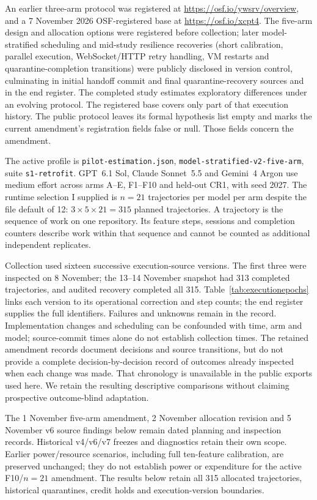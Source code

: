 An earlier three-arm protocol was registered at \url{https://osf.io/ywsrv/overview},
and a 7 November 2026 OSF-registered base at
\url{https://osf.io/xcpt4}. The five-arm design and allocation options were
registered before collection; later model-stratified scheduling and mid-study resilience
recoveries (short calibration, parallel execution, WebSocket/HTTP retry
handling, VM restarts and quarantine-completion transitions) were publicly
disclosed in version control, culminating in initial handoff commit
 and final quarantine-recovery sources
 and  in the end register.
The completed study estimates exploratory differences under an evolving
protocol. The registered base covers only part of that execution history.
The public protocol leaves its formal hypothesis list empty and marks the
current amendment's registration fields false or null. Those fields concern
the amendment.

The active profile is \nolinkurl{pilot-estimation.json},
\texttt{model-stratified-v2-five-arm}, suite \texttt{s1-retrofit}.
GPT~6.1 Sol, Claude Sonnet~5.5 and Gemini~4 Argon use medium effort across
arms A--E, F1--F10 and held-out CR1, with seed 2027. The runtime selection
I supplied is $n=21$ trajectories per model per arm despite the
file default of 12: $3\times5\times21=315$ planned trajectories.
A trajectory is the sequence of work on one repository. Its feature steps,
sessions and completion counters describe work within that sequence and
cannot be counted as additional independent replicates.

Collection used sixteen successive execution-source versions.
The first three were inspected on 8 November;
the 13--14 November snapshot had 313 completed trajectories, and audited
recovery completed all 315. Table~\ref{tab:executionepochs} links each version
to its operational correction and step counts; the end register supplies
the full identifiers. Failures and unknowns remain in the record.
Implementation changes and scheduling can be confounded with time, arm
and model; source-commit times alone do not establish collection times.
The retained amendment records document decisions and source transitions,
but do not provide a complete decision-by-decision record of outcomes
already inspected when each change was made. That chronology is unavailable
in the public exports used here. We retain the resulting descriptive
comparisons without claiming prospective outcome-blind adaptation.

The 1 November five-arm amendment, 2 November allocation revision and
5 November v6 source findings below remain dated planning and inspection
records. Historical v4/v6/v7 freezes and diagnostics retain their own
scope. Earlier power/resource scenarios, including full ten-feature
calibration, are preserved unchanged; they do not establish power or
expenditure for the active F10/$n=21$ amendment.
The results below retain all 315 allocated trajectories, historical
quarantines, credit holds and execution-version boundaries.

